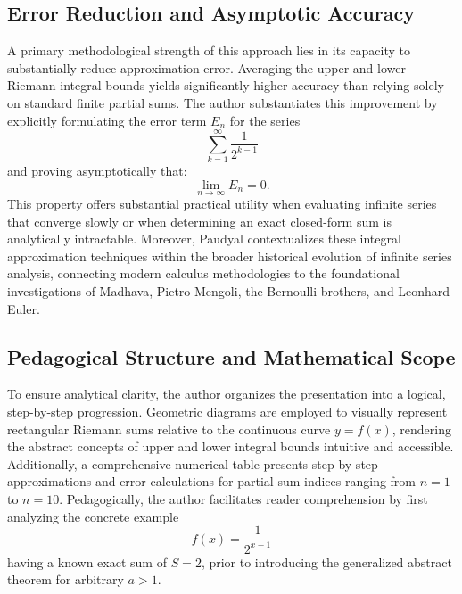 \documentclass[11pt, a4paper]{article}
\begin{document}
\subsection{Error Reduction and Asymptotic Accuracy}

A primary methodological strength of this approach lies in its capacity to substantially reduce approximation error. Averaging the upper and lower Riemann integral bounds yields significantly higher accuracy than relying solely on standard finite partial sums. The author substantiates this improvement by explicitly formulating the error term $E_{n}$ for the series
\begin{equation}
    \sum_{k=1}^{\infty} \frac{1}{2^{k-1}}
\end{equation}
and proving asymptotically that:
\begin{equation}
    \lim_{n \to \infty} E_{n} = 0.
\end{equation}
This property offers substantial practical utility when evaluating infinite series that converge slowly or when determining an exact closed-form sum is analytically intractable. Moreover, Paudyal contextualizes these integral approximation techniques within the broader historical evolution of infinite series analysis, connecting modern calculus methodologies to the foundational investigations of Madhava, Pietro Mengoli, the Bernoulli brothers, and Leonhard Euler.

\subsection{Pedagogical Structure and Mathematical Scope}

To ensure analytical clarity, the author organizes the presentation into a logical, step-by-step progression. Geometric diagrams are employed to visually represent rectangular Riemann sums relative to the continuous curve $y = f(x)$, rendering the abstract concepts of upper and lower integral bounds intuitive and accessible. Additionally, a comprehensive numerical table presents step-by-step approximations and error calculations for partial sum indices ranging from $n = 1$ to $n = 10$. Pedagogically, the author facilitates reader comprehension by first analyzing the concrete example
\begin{equation}
    f(x) = \frac{1}{2^{x-1}}
\end{equation}
having a known exact sum of $S = 2$, prior to introducing the generalized abstract theorem for arbitrary $a > 1$.
\end{document}
